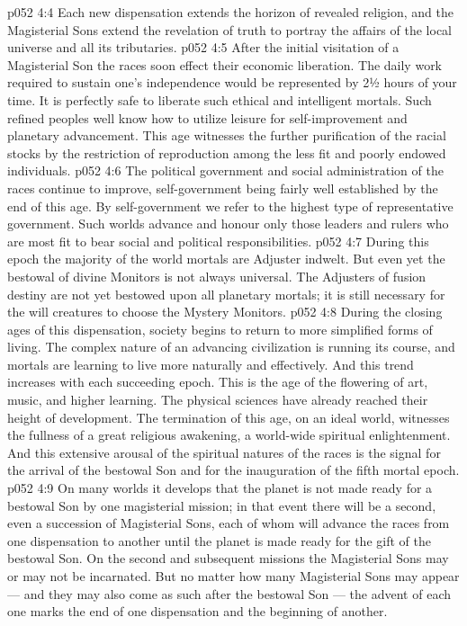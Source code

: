 \vs p052 4:4 Each new dispensation extends the horizon of revealed religion, and the Magisterial Sons extend the revelation of truth to portray the affairs of the local universe and all its tributaries.
\vs p052 4:5 \pc After the initial visitation of a Magisterial Son the races soon effect their economic liberation. The daily work required to sustain one’s independence would be represented by 2½ hours of your time. It is perfectly safe to liberate such ethical and intelligent mortals. Such refined peoples well know how to utilize leisure for self\hyp{}improvement and planetary advancement. This age witnesses the further purification of the racial stocks by the restriction of reproduction among the less fit and poorly endowed individuals.
\vs p052 4:6 The political government and social administration of the races continue to improve, self\hyp{}government being fairly well established by the end of this age. By self\hyp{}government we refer to the highest type of representative government. Such worlds advance and honour only those leaders and rulers who are most fit to bear social and political responsibilities.
\vs p052 4:7 During this epoch the majority of the world mortals are Adjuster indwelt. But even yet the bestowal of divine Monitors is not always universal. The Adjusters of fusion destiny are not yet bestowed upon all planetary mortals; it is still necessary for the will creatures to choose the Mystery Monitors.
\vs p052 4:8 During the closing ages of this dispensation, society begins to return to more simplified forms of living. The complex nature of an advancing civilization is running its course, and mortals are learning to live more naturally and effectively. And this trend increases with each succeeding epoch. This is the age of the flowering of art, music, and higher learning. The physical sciences have already reached their height of development. The termination of this age, on an ideal world, witnesses the fullness of a great religious awakening, a world\hyp{}wide spiritual enlightenment. And this extensive arousal of the spiritual natures of the races is the signal for the arrival of the bestowal Son and for the inauguration of the fifth mortal epoch.
\vs p052 4:9 \pc On many worlds it develops that the planet is not made ready for a bestowal Son by one magisterial mission; in that event there will be a second, even a succession of Magisterial Sons, each of whom will advance the races from one dispensation to another until the planet is made ready for the gift of the bestowal Son. On the second and subsequent missions the Magisterial Sons may or may not be incarnated. But no matter how many Magisterial Sons may appear --- and they may also come as such after the bestowal Son --- the advent of each one marks the end of one dispensation and the beginning of another.
